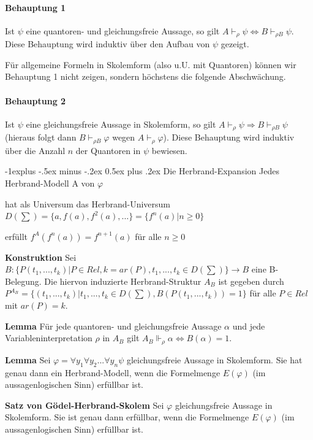 \documentclass[a4paper]{article}
\makeatletter
\renewcommand{\note}[2]{\begin{noteBox} \textbf{#1} #2 \end{noteBox}}
\renewcommand{\subsection}{\@startsection{subsection}{2}{0mm}%
                {-1explus -.5ex minus -.2ex}%
                {0.5ex plus .2ex}%
                {\normalfont\normalsize\bfseries}}
\makeatother
\begin{document}
\begin{multicols}{3}
  \paragraph{Behauptung 1 }
  Ist $\psi$ eine quantoren- und gleichungsfreie Aussage, so gilt $A\vdash_{\rho}\psi \Leftrightarrow B\vdash_{\rho B} \psi$. Diese Behauptung wird induktiv über den Aufbau von $\psi$ gezeigt.

  Für allgemeine Formeln in Skolemform (also u.U. mit Quantoren) können wir Behauptung 1 nicht zeigen, sondern höchstens die folgende Abschwächung.

  \paragraph{Behauptung 2 }
  Ist $\psi$ eine gleichungsfreie Aussage in Skolemform, so gilt $A\vdash_\rho \psi \Rightarrow B\vdash_{\rho B}\psi$ (hieraus folgt dann $B\vdash_{\rho B}\varphi$ wegen $A\vdash_\rho \varphi$). Diese Behauptung wird induktiv über die Anzahl $n$ der Quantoren in $\psi$ bewiesen.

  \subsection{Die Herbrand-Expansion}
  Jedes Herbrand-Modell A von $\varphi$
  \begin{itemize*}
    \item hat als Universum das Herbrand-Universum $D(\sum)=\{a,f(a),f^2 (a),...\}=\{f^n(a)|n\geq 0\}$
    \item erfüllt $f^A(f^n(a))= f^{n+1} (a)$ für alle $n\geq 0$
  \end{itemize*}

  \note{Konstruktion}{Sei $B:\{P(t_1,...,t_k)|P\in Rel,k=ar(P),t_1,...,t_k\in D(\sum)\}\rightarrow B$ eine
    B-Belegung. Die hiervon induzierte Herbrand-Struktur $A_B$ ist gegeben durch $P^{A_B} = \{(t_1,...,t_k)|t_1,...,t_k\in D(\sum),B(P(t_1,...,t_k))= 1\}$ für alle $P\in Rel$ mit $ar(P)=k$. }

  \note{Lemma}{Für jede quantoren- und gleichungsfreie Aussage $\alpha$ und jede Variableninterpretation $\rho$ in $A_B$ gilt $A_B\Vdash_\rho\alpha \Leftrightarrow B(\alpha)= 1$.}

  \note{Lemma}{Sei $\varphi=\forall y_1 \forall y_2 ...\forall y_n\psi$ gleichungsfreie Aussage in Skolemform. Sie hat genau dann ein Herbrand-Modell, wenn die Formelmenge $E(\varphi)$ (im aussagenlogischen Sinn) erfüllbar ist.}

  \note{Satz von Gödel-Herbrand-Skolem}{Sei $\varphi$ gleichungsfreie Aussage in Skolemform. Sie ist genau dann erfüllbar, wenn die Formelmenge $E(\varphi)$ (im aussagenlogischen Sinn) erfüllbar ist.}


\end{multicols}
\end{document}
